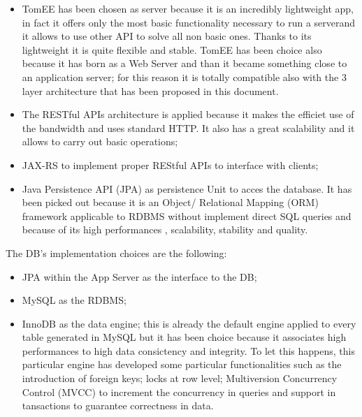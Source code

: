 \begin{itemize}
	\item TomEE has been chosen as server because it is an incredibly lightweight app, in fact it offers only the most basic 				functionality necessary to run a serverand it allows to use other API to solve all non basic ones. Thanks to its lightweight it is 			quite flexible and stable. TomEE has been choice also because it has born as a Web Server and than it became something close to 		an application server; for this reason it is totally compatible also with the 3 layer architecture that has been proposed in this 			document.
	\item The RESTful APIs architecture is applied because it makes the efficiet use of the bandwidth and uses standard HTTP. It 			also has a great scalability and it allows to carry out basic operations;
	\item JAX-RS to implement proper REStful APIs to interface with clients;
	\item Java Persistence API (JPA) as persistence Unit to acces the database. It has been picked out because it is an Object/			Relational Mapping (ORM) framework applicable to RDBMS without implement direct SQL queries and because of its high 				performances , scalability, stability and quality.
\end{itemize}
The DB's implementation choices are the following:
\begin{itemize}
	\item JPA within the App Server as the interface to the DB;
	\item MySQL as the RDBMS;
	\item InnoDB as the data engine; this is already the default engine applied to every table generated in MySQL but it has been 			choice because it associates high performances to high data consictency and integrity. To let this happens, this particular 			engine has developed some particular functionalities such as the introduction of foreign keys; locks at row level; Multiversion  			Concurrency Control (MVCC) to increment the concurrency in queries and support in tansactions to guarantee correctness in data.
\end{itemize}

